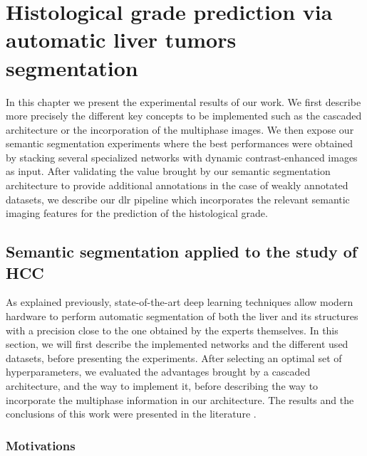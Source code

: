 \chapter{Histological grade prediction via automatic liver tumors segmentation}\label{contributions_xp}


In this chapter we present the experimental results of our work.
We first describe more precisely the different key concepts 
to be implemented such as the cascaded architecture or the 
incorporation of the multiphase images.
We then expose our semantic segmentation experiments where 
the best performances were obtained by stacking several 
specialized networks with dynamic contrast-enhanced images as input.
After validating the value brought by our semantic segmentation architecture
to provide additional annotations in the case of weakly annotated datasets, 
we describe our \ac{dlr} pipeline which incorporates the relevant semantic imaging features 
for the prediction of the histological grade.

\section{Semantic segmentation applied to the study of HCC}

As explained previously, state-of-the-art deep learning techniques allow
modern hardware to perform automatic segmentation of both the liver and
its structures with a precision close to the one obtained by the experts
themselves.
In this section, we will first describe the implemented
networks and the different used datasets, before presenting the experiments.
After selecting an optimal set of hyperparameters, we evaluated the
advantages brought by a cascaded architecture, and the way to implement
it, before describing the way to incorporate the multiphase information
in our architecture.
The results and the conclusions of this work were presented in the
literature \cite{Ouhmich2019}.


\subsection{Motivations}

